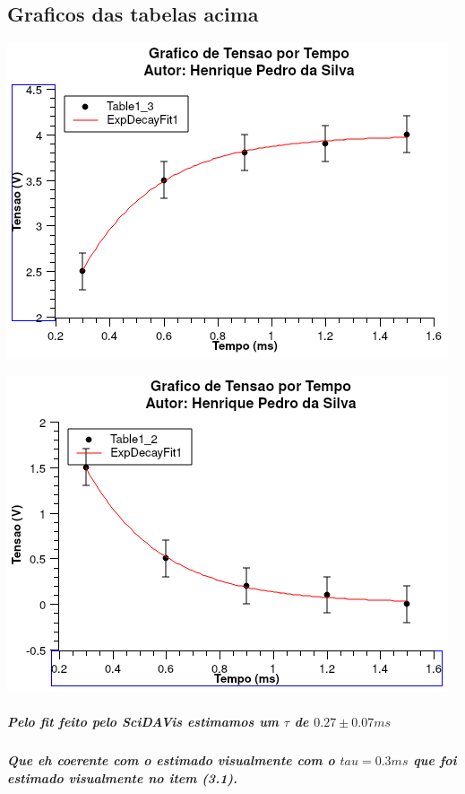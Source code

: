 \documentclass[12pt,twoside, a4paper, twocolumn]{article}
\begin{document}
\subsection{Graficos das tabelas acima}

\begin{adjustbox}{scale=0.70}
    \includegraphics{Graph2.png}
\end{adjustbox}

\begin{adjustbox}{scale=0.70}
    \includegraphics{Graph3.png}
\end{adjustbox}

\subparagraph*{Pelo fit feito pelo SciDAVis estimamos um $\tau$ de $0.27 \pm 0.07 ms$}

\subparagraph*{Que eh coerente com o estimado visualmente com o $tau = 0.3ms$ que foi estimado visualmente no item (3.1).}
\end{document}
